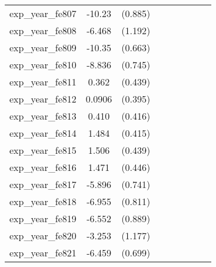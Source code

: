 {\begin{tabular}{l*{4}{cc}}
exp\_year\_fe807&   -10.23\sym{***}&  (0.885)&                  &         &                  &         &                  &         \\
exp\_year\_fe808&   -6.468\sym{***}&  (1.192)&                  &         &                  &         &                  &         \\
exp\_year\_fe809&   -10.35\sym{***}&  (0.663)&                  &         &                  &         &                  &         \\
exp\_year\_fe810&   -8.836\sym{***}&  (0.745)&                  &         &                  &         &                  &         \\
exp\_year\_fe811&    0.362         &  (0.439)&                  &         &                  &         &                  &         \\
exp\_year\_fe812&   0.0906         &  (0.395)&                  &         &                  &         &                  &         \\
exp\_year\_fe813&    0.410         &  (0.416)&                  &         &                  &         &                  &         \\
exp\_year\_fe814&    1.484\sym{***}&  (0.415)&                  &         &                  &         &                  &         \\
exp\_year\_fe815&    1.506\sym{***}&  (0.439)&                  &         &                  &         &                  &         \\
exp\_year\_fe816&    1.471\sym{***}&  (0.446)&                  &         &                  &         &                  &         \\
exp\_year\_fe817&   -5.896\sym{***}&  (0.741)&                  &         &                  &         &                  &         \\
exp\_year\_fe818&   -6.955\sym{***}&  (0.811)&                  &         &                  &         &                  &         \\
exp\_year\_fe819&   -6.552\sym{***}&  (0.889)&                  &         &                  &         &                  &         \\
exp\_year\_fe820&   -3.253\sym{**} &  (1.177)&                  &         &                  &         &                  &         \\
exp\_year\_fe821&   -6.459\sym{***}&  (0.699)&                  &         &                  &         &                  &         \\

\end{tabular}}
